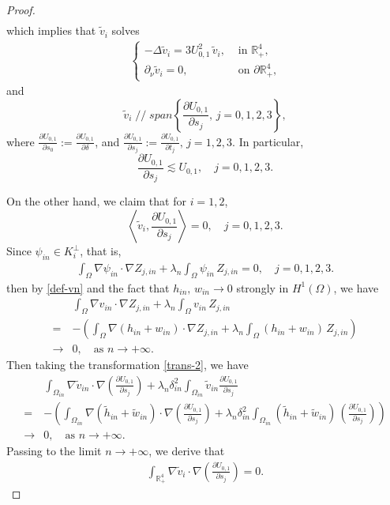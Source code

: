 \documentclass[a4paper,reqno,11pt,oneside]{amsart}
\numberwithin{equation}{section}
\newcommand{\R}{\mathbb{R}}
\begin{document}
\begin{proof}
\begin{align*}
\end{align*}
which implies  that $\widetilde{v}_i$ solves
\begin{align*}
    \begin{cases}
-\Delta \widetilde{v}_i= 3U_{0,1}^2\,\widetilde{v}_i, &\text{ in $\R^4_+$},\\
\partial_{\nu} \widetilde{v}_i=0,&\text{ on $\partial\R^4_+$,}
\end{cases}
\end{align*}
and { $$\widetilde{v}_i \mathop{//}  span\left\{\frac{\partial U_{0,1}}{\partial s_j},\,j=0,1,2,3\right\},$$}
where $\frac{\partial U_{0,1}}{\partial s_0}:=\frac{\partial U_{0,1}}{\partial \delta}$, and $\frac{\partial U_{0,1}}{\partial s_j}:=\frac{\partial U_{0,1}}{\partial t_j},\,j=1,2,3.$ In particular,
$$\frac{\partial U_{0,1}}{\partial s_j}\lesssim U_{0,1},\quad j=0,1,2,3.$$

\medskip
On the other hand, we claim that for $i=1,2$,
$$\left\langle\widetilde{v}_i,\frac{\partial U_{0,1}}{\partial s_j}\right\rangle=0,\quad j=0,1,2,3.$$
Since $\psi_{in}\in K_i^{\perp}$, that is,
\begin{align*}
    \displaystyle\int_{ \Omega} \nabla \psi_{in} \cdot \nabla Z_{j,in}+\lambda_n\displaystyle\int_{ \Omega}\psi_{in}\,Z_{j,in}=0,\quad j=0,1,2,3.
\end{align*}
then by \eqref{def-vn} and the fact that $h_{in},\,w_{in}\to 0$ strongly in $H^1(\Omega)$, we have
\begin{align*}
    &\displaystyle\int_{ \Omega} \nabla v_{in} \cdot \nabla Z_{j,in}+\lambda_n\displaystyle\int_{ \Omega}v_{in}\,Z_{j,in}\nonumber\\=&-\left(\displaystyle\int_{ \Omega} \nabla \left(h_{in}+w_{in}\right) \cdot \nabla Z_{j,in}+\lambda_n\displaystyle\int_{ \Omega}\left(h_{in}+w_{in}\right) \,Z_{j,in}\right)\nonumber\\
    \longrightarrow&0,\quad\text{as $n\to+\infty$.}
\end{align*}
Then taking the transformation \eqref{trans-2}, we have
\begin{align*}
    &\displaystyle\int_{ \Omega_{in}} \nabla \widetilde{v}_{in} \cdot \nabla \left(\frac{\partial U_{0,1}}{\partial s_j}\right)+\lambda_n\delta_{in}^2\displaystyle\int_{\Omega_{in}}\widetilde{v}_{in}\frac{\partial U_{0,1}}{\partial s_j}\nonumber\\=&-\left(\displaystyle\int_{ \Omega_{in}} \nabla \left(\widetilde{h}_{in}+\widetilde{w}_{in}\right) \cdot\nabla \left(\frac{\partial U_{0,1}}{\partial s_j}\right)+\lambda_n\delta_{in}^2\displaystyle\int_{ \Omega_{in}}\left(\widetilde{h}_{in}+\widetilde{w}_{in}\right) \, \left(\frac{\partial U_{0,1}}{\partial s_j}\right)\right)\nonumber\\
    \longrightarrow&0,\quad\text{as $n\to+\infty$.}
\end{align*}
Passing to the limit $n\to+\infty$, we derive that
\begin{align}
    \label{final} \displaystyle\int_{ \R^4_+} \nabla \widetilde{v}_i \cdot \nabla \left(\frac{\partial U_{0,1}}{\partial s_j}\right)=0.
\end{align}


\end{proof}
\end{document}
